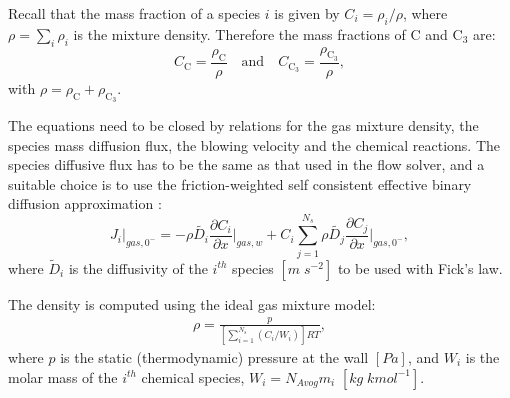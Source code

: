 \documentclass[10pt]{article}
\newcommand{\C}{\text{C}}
\begin{document}
\vspace{12pt}

Recall that the mass fraction of a species $i$ is given by $C_i= \rho_i/\rho$, where $\rho=\sum_i \rho_i$ is the mixture density. Therefore the mass fractions of C and C$_3$ are:
\begin{equation*}
 \label{eq:massfrac}
C_{\C}=\dfrac{\rho_\C}{\rho} \quad \mbox{and}\quad C_{\C_3}=\dfrac{\rho_{\C_3}}{\rho}, 
\end{equation*}
with $\rho=\rho_{\C}+\rho_{\C_3}.$

The equations need to be closed by relations for the gas mixture density, the species mass diffusion flux, the blowing velocity and the chemical reactions. The species diffusive flux has to be the same as that used in the flow solver, and a suitable choice is to use the friction-weighted self consistent effective binary diffusion approximation \citep{Ramshaw-Chang:1996}:
$$J_i \vert_{gas,0^-} =- \rho  \tilde{D_i} \frac{\partial C_i}{\partial x}\vert_{gas,w} + C_i \sum_{j=1}^{N_s}  \rho  \tilde{D_j} \frac{\partial C_j}{\partial x} \vert_{gas,0^-} ,$$
where   $\tilde{D}_i$ is the diffusivity  of the $i^{th}$ species $[m\;s^{-2}]$ to be used with Fick's law.

The density is computed using the ideal gas mixture model:
\begin{align*}
\rho = \frac{p}{\left[ \sum_{i=1}^{N_s}(C_i/W_i)\right] RT} \label{eq:ideal_gas_density},
\end{align*}
where $p$  is the static (thermodynamic) pressure at the wall $[Pa]$, and $W_i$ is the molar mass of the $i^{th}$ chemical species, $W_i = N_{Avog} m_i$  $[kg\;kmol^{-1}]$.
\end{document}
